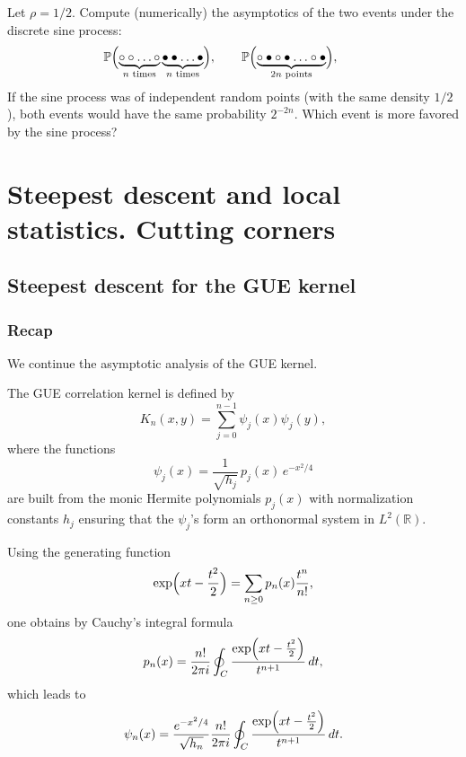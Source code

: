 \documentclass[letterpaper,11pt,oneside,reqno]{book}
\numberwithin{equation}{chapter}  %
\theoremstyle{definition}
\begin{document}
Let $\rho=1/2$.
Compute (numerically) the asymptotics of the two events under the discrete sine process:
\begin{equation*}
	\operatorname{\mathbb{P}}
	\Bigl(
		\underbrace{\circ \circ\ldots\circ}_{n\text{ times}}
		\underbrace{\bullet \bullet\ldots\bullet}_{n\text{ times}}
	\Bigr),\qquad
	\operatorname{\mathbb{P}}
	\Bigl(
		\underbrace{\circ\bullet\circ\bullet\ldots\circ\bullet}_{2n\text{ points}}
	\Bigr),\qquad
\end{equation*}
If the sine process was of independent random points (with the same density $1/2$),
both events
would have the same probability $2^{-2n}$.
Which event is more favored by the sine process?
















\chapter{Steepest descent and local statistics. Cutting corners}
\label{chap:lecture7}





\section{Steepest descent for the GUE kernel}
\label{lecture7:sec:steepest-descent-GUE}

\subsection{Recap}

We continue the asymptotic analysis of the GUE kernel.

The GUE correlation kernel is defined by
\[
K_n(x,y)=\sum_{j=0}^{n-1}\psi_j(x)\psi_j(y),
\]
where the functions
\[
\psi_j(x)=\frac{1}{\sqrt{h_j}}\,p_j(x)\,e^{-x^2/4}
\]
are built from the monic Hermite polynomials \(p_j(x)\) with normalization constants \(h_j\) ensuring that the \(\psi_j\)'s form an orthonormal system in \(L^2(\mathbb{R})\).

Using the generating function
\[
\exp\Bigl(xt-\frac{t^2}{2}\Bigr)=\sum_{n\ge0}p_n(x)\frac{t^n}{n!},
\]
one obtains by Cauchy’s integral formula
\[
p_n(x)=\frac{n!}{2\pi i}\oint_C\frac{\exp\Bigl(xt-\frac{t^2}{2}\Bigr)}{t^{n+1}}\,dt,
\]
which leads to
\[
\psi_n(x)=\frac{e^{-x^2/4}}{\sqrt{h_n}}\frac{n!}{2\pi i}\oint_C\frac{\exp\Bigl(xt-\frac{t^2}{2}\Bigr)}{t^{n+1}}\,dt.
\]
\end{document}
